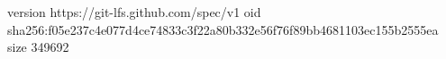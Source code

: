 version https://git-lfs.github.com/spec/v1
oid sha256:f05e237c4e077d4ce74833c3f22a80b332e56f76f89bb4681103ec155b2555ea
size 349692
